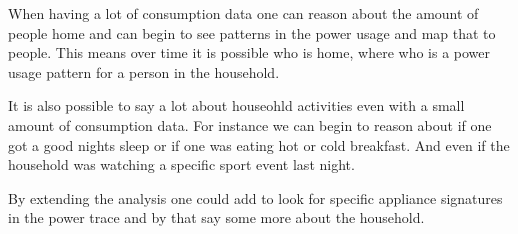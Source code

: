 When having a lot of consumption data one can reason about the amount of people home and can begin to see patterns in the power usage and map that to people.
This means over time it is possible who is home, where who is a power usage pattern for a person in the household.

It is also possible to say a lot about houseohld activities even with a small amount of consumption data.
For instance we can begin to reason about if one got a good nights sleep or if one was eating hot or cold breakfast.
And even if the household was watching a specific sport event last night.

By extending the analysis one could add to look for specific appliance signatures in the power trace and by that say some more about the household.\cite{NILM}
